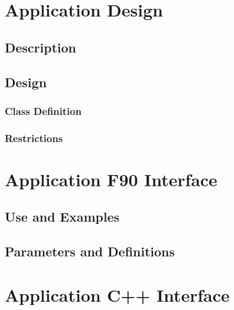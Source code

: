 \documentclass[]{article}
\begin{document}
\section{Application Design}

\subsection{Description}




\subsection{Design}




\subsubsection{Class Definition}




\subsubsection{Restrictions}




\section{Application F90 Interface}

\subsection{Use and Examples}




\subsection{Parameters and Definitions}








\section{Application C++ Interface}
\end{document}
